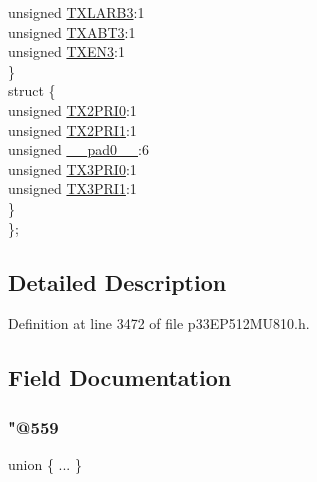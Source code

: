 \begin{DoxyCompactItemize}
\begin{tabbing}
\>\>unsigned \hyperlink{structtag_c1_t_r23_c_o_n_b_i_t_s_ad6e8611b390790bb11e348fb7d62807b}{TXLARB3}:1\\
\>\>unsigned \hyperlink{structtag_c1_t_r23_c_o_n_b_i_t_s_ac69208cdc9f415f7aeb25c382679da30}{TXABT3}:1\\
\>\>unsigned \hyperlink{structtag_c1_t_r23_c_o_n_b_i_t_s_aaf25622f65dc89d420053ec650bc9635}{TXEN3}:1\\
\>\} \\
\>struct \{\\
\>\>unsigned \hyperlink{structtag_c1_t_r23_c_o_n_b_i_t_s_a7d03ca8b5705b55da0b6702ec0001d08}{TX2PRI0}:1\\
\>\>unsigned \hyperlink{structtag_c1_t_r23_c_o_n_b_i_t_s_ab62b5330890052fa3c5d72d7a2535faa}{TX2PRI1}:1\\
\>\>unsigned \hyperlink{structtag_c1_t_r23_c_o_n_b_i_t_s_adf71f3d8410c1f1dbbc96680a92c49af}{\_\_pad0\_\_}:6\\
\>\>unsigned \hyperlink{structtag_c1_t_r23_c_o_n_b_i_t_s_ada6b9c6a4931f1d7b7fc7ab3eb06a813}{TX3PRI0}:1\\
\>\>unsigned \hyperlink{structtag_c1_t_r23_c_o_n_b_i_t_s_a319e696565d0e4a56de2f6e584c59c63}{TX3PRI1}:1\\
\>\} \\
\}; \\

\end{tabbing}\end{DoxyCompactItemize}


\subsection{Detailed Description}


Definition at line 3472 of file p33\+E\+P512\+M\+U810.\+h.



\subsection{Field Documentation}
\mbox{\label{structtag_c1_t_r23_c_o_n_b_i_t_s_abd88a03b01349acd16fc6d1240b32601}} 
\subsubsection{\texorpdfstring{"@559}{@559}}
{\footnotesize\ttfamily union \{ ... \} }

\mbox{\label{structtag_c1_t_r23_c_o_n_b_i_t_s_adf71f3d8410c1f1dbbc96680a92c49af}} 

